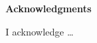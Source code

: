 


\vspace*{0.5cm}
\begin{center}
	\textbf{\large Acknowledgments}
\end{center}
\vspace{25pt}



I acknowledge \ldots




